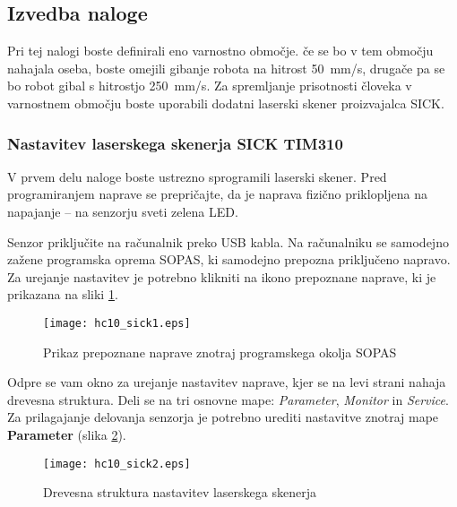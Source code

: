 \subsection*{Izvedba naloge}

Pri tej nalogi boste definirali eno varnostno območje. če se bo v tem območju nahajala oseba, boste omejili gibanje robota na hitrost 50~mm/s, drugače pa se bo robot gibal s hitrostjo 250~mm/s. Za spremljanje prisotnosti človeka v varnostnem območju boste uporabili dodatni laserski skener proizvajalca SICK.

\subsubsection*{Nastavitev laserskega skenerja SICK TIM310}

V prvem delu naloge boste ustrezno sprogramili laserski skener. Pred programiranjem naprave se prepričajte, da je naprava fizično priklopljena na napajanje -- na senzorju sveti zelena LED.

Senzor priključite na računalnik preko USB kabla. Na računalniku se samodejno zažene programska oprema SOPAS, ki samodejno prepozna priključeno napravo. Za urejanje nastavitev je potrebno klikniti na ikono prepoznane naprave, ki je prikazana na sliki \ref{fig:hc10_sick1}.

\begin{figure}[!hbt]
	\centering
	\texttt{[image: hc10\_sick1.eps]}
	\caption{Prikaz prepoznane naprave znotraj programskega okolja SOPAS}
	\label{fig:hc10_sick1}
\end{figure}

Odpre se vam okno za urejanje nastavitev naprave, kjer se na levi strani nahaja drevesna struktura. Deli se na tri osnovne mape: \emph{Parameter}, \emph{Monitor} in \emph{Service}. Za prilagajanje delovanja senzorja je potrebno urediti nastavitve znotraj mape \textbf{Parameter} (slika \ref{fig:hc10_sick2}).

\begin{figure}[!hbt]
	\centering
	\texttt{[image: hc10\_sick2.eps]}
	\caption{Drevesna struktura nastavitev laserskega skenerja}
	\label{fig:hc10_sick2}
\end{figure}

